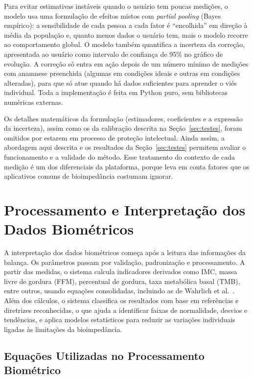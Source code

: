 Para evitar estimativas instáveis quando o usuário tem poucas medições, o modelo usa uma
formulação de efeitos mistos com \emph{partial pooling} (Bayes empírico): a sensibilidade de
cada pessoa a cada fator é ``encolhida'' em direção à média da população e, quanto menos dados
o usuário tem, mais o modelo recorre ao comportamento global. O modelo também quantifica a
incerteza da correção, apresentada ao usuário como intervalo de confiança de 95\% no gráfico
de evolução. A correção só entra em ação depois de um número mínimo de medições com anamnese
preenchida (algumas em condições ideais e outras em condições alteradas), para que só atue
quando há dados suficientes para aprender o viés individual. Toda a implementação é feita em
Python puro, sem bibliotecas numéricas externas.

Os detalhes matemáticos da formulação (estimadores, coeficientes e a expressão da incerteza),
assim como os da calibração descrita na Seção~\ref{sec:testes}, foram omitidos por estarem em
processo de proteção intelectual. Ainda assim, a abordagem aqui descrita e os resultados da
Seção~\ref{sec:testes} permitem avaliar o funcionamento e a validade do método. Esse
tratamento do contexto de cada medição é um dos diferenciais da plataforma, porque leva em
conta fatores que os aplicativos comuns de bioimpedância costumam ignorar.

\section{Processamento e Interpretação dos Dados Biométricos}

A interpretação dos dados biométricos começa após a leitura das informações da balança. Os
parâmetros passam por validação, padronização e processamento. A partir das medidas, o
sistema calcula indicadores derivados como IMC, massa livre de gordura (FFM), percentual de
gordura, taxa metabólica basal (TMB), entre outros, usando equações consolidadas, incluindo
as de Wahrlich et al.~\cite{wahrlich2026}. Além dos cálculos, o sistema classifica os
resultados com base em referências e diretrizes reconhecidas, o que ajuda a identificar
faixas de normalidade, desvios e tendências, e aplica modelos estatísticos para reduzir as
variações individuais ligadas às limitações da bioimpedância.

\subsection{Equações Utilizadas no Processamento Biométrico}
\label{sec:equacoes}

